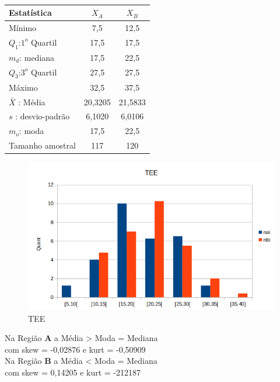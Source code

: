 \\
\begin{minipage}[!b]{0.40\linewidth}
\begin{tabular}{ l c c }
\hline
Estatística & $X_A$ & $X_B$ \\
\hline
Mínimo & 7,5 & 12,5\\
$Q_1$:$1^o$ Quartil & 17,5 & 17,5 \\
$m_d$: mediana & 17,5 & 22,5\\
$Q_3$:$3^o$ Quartil & 27,5 & 27,5 \\
Máximo & 32,5 & 37,5 \\
\hline
$\bar{X}$ : Média & 20,3205 & 21,5833 \\
$s$ : desvio-padrão & 6,1020 & 6,0106\\
$m_o$: moda & 17,5 & 22,5\\
\hline
Tamanho amostral & 117 & 120 \\
\hline
\end{tabular}
\label{Tab:Resulatdos}
\end{minipage}
\hspace{2cm}
\begin{minipage}[!b]{0.40\linewidth}
\begin{figure}[H]
\centering
\includegraphics[scale=0.5]{./image/TEE.png}
\caption{TEE}
\label{TEE}
\end{figure}
\end{minipage}
\newpage
\noindent
Na Região \textbf{A} a Média > Moda = Mediana \\ 
com skew = -0,02876 e kurt = -0,50909 \\
Na Região \textbf{B} a Média < Moda = Mediana \\
com skew = 0,14205 e kurt = -212187 \\

